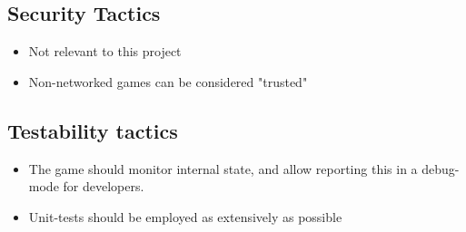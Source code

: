 \subsection{Security Tactics}
\begin{itemize}
	\item Not relevant to this project
	\item Non-networked games can be considered "trusted"
\end{itemize}

\subsection{Testability tactics}
\begin{itemize}
	\item The game should monitor internal state, and allow reporting this
	in a debug-mode for developers.
	\item Unit-tests should be employed as extensively as possible
\end{itemize}